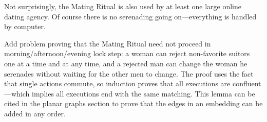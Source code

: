 Not surprisingly, the Mating Ritual is also used by at least one large
online dating agency.  Of course there is no serenading going
on---everything is handled by computer.

\begin{problems}

\practiceproblems
{}

\classproblems

\homeworkproblems
{}

\examproblems
{}

\begin{editingnotes}
\begin{problem*}
Add problem proving that the Mating Ritual need not proceed in
morning/afternoon/evening lock step: a woman can reject non-favorite
suitors one at a time and at any time, and a rejected man can change
the woman he serenades without waiting for the other men to change.
The proof uses the fact that single actions commute, so induction
proves that all executions are confluent---which implies all
executions end with the same matching.  This lemma can be cited in the
planar graphs section to prove that the edges in an embedding can be
added in any order.
\end{problem*}
\end{editingnotes}

\end{problems}
